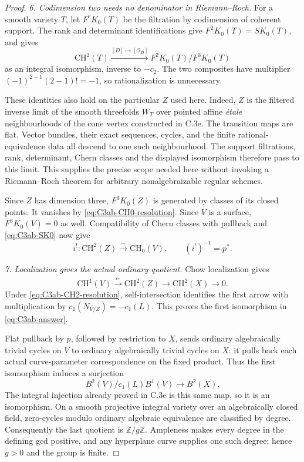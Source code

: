 \begin{proof}
\emph{6. Codimension two needs no denominator in Riemann--Roch.}
For a smooth variety $T$, let $F^rK_0(T)$ be the filtration by
codimension of coherent support. The rank and determinant
identifications give $F^2K_0(T)=SK_0(T)$, and
\citet[Example 15.3.6, p.~298]{frC4Fulton1998}
gives
\[
 \mathrm{CH}^2(T)\xrightarrow{[D]\mapsto[\mathcal O_D]}
                 F^2K_0(T)/F^3K_0(T)
\]
as an integral isomorphism, inverse to $-c_2$. The two composites
have multiplier $(-1)^{2-1}(2-1)!=-1$, so rationalization is
unnecessary.

These identities also hold on the particular $Z$ used here.
Indeed, $Z$ is the filtered inverse limit of the smooth
threefolds $W_T$ over pointed affine \emph{\'etale}
neighbourhoods of the cone vertex constructed in C.3e.
The transition maps are flat. Vector bundles, their exact
sequences, cycles, and the finite rational-equivalence data
all descend to one such neighbourhood. The support filtrations,
rank, determinant, Chern classes and the displayed isomorphism
therefore pass to this limit. This supplies the precise scope
needed here without invoking a Riemann--Roch theorem for
arbitrary nonalgebraizable regular schemes.

Since $Z$ has dimension three, $F^3K_0(Z)$ is generated by
classes of its closed points. It vanishes by
\eqref{eq:C3ab-CH0-resolution}. Since $V$ is a surface,
$F^3K_0(V)=0$ as well. Compatibility of Chern classes with
pullback and \eqref{eq:C3ab-SK0} now give
\begin{equation}\label{eq:C3ab-CH2-resolution}
 i^!: \mathrm{CH}^2(Z)\xrightarrow{\sim}\mathrm{CH}_0(V),
                      \qquad (i^!)^{-1}=p^*.
\end{equation}

\emph{7. Localization gives the actual ordinary quotient.}
Chow localization gives
\[
 \mathrm{CH}^1(V)\xrightarrow{i_*}\mathrm{CH}^2(Z)
       \longrightarrow\mathrm{CH}^2(X)\longrightarrow0.
\]
Under \eqref{eq:C3ab-CH2-resolution}, self-intersection
identifies the first arrow with multiplication by
$c_1(N_{V/Z})=-c_1(L)$. This proves the first isomorphism
in \eqref{eq:C3ab-answer}.

Flat pullback by $p$, followed by restriction to $X$, sends
ordinary algebraically trivial cycles on $V$ to ordinary
algebraically trivial cycles on $X$: it pulls back each actual
curve-parameter correspondence on the fixed product. Thus the
first isomorphism induces a surjection
\[
 B^2(V)/c_1(L)B^1(V)\longrightarrow B^2(X).
\]
The integral injection already proved in C.3e is this same map,
so it is an isomorphism. On a smooth projective integral
variety over an algebraically closed field, zero-cycles modulo
ordinary algebraic equivalence are classified by degree.
Consequently the last quotient is $\mathbb Z/g\mathbb Z$.
Ampleness makes every degree in the defining gcd positive,
and any hyperplane curve supplies one such degree; hence
$g>0$ and the group is finite.


\end{proof}
